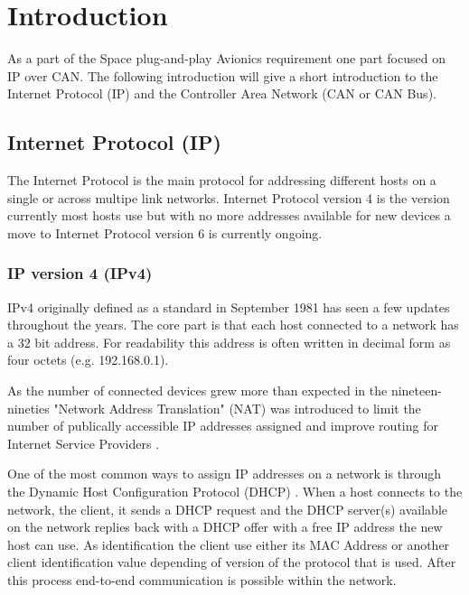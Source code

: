 \section{Introduction}\label{sec:introduction}
As a part of the Space plug-and-play Avionics requirement one part
focused on IP over CAN. The following introduction will give a short
introduction to the Internet Protocol (IP) and the Controller Area Network
(CAN or CAN Bus).

\subsection{Internet Protocol (IP)}
The Internet Protocol is the main protocol for addressing different hosts on a
single or across multipe link networks. Internet Protocol version 4 is the
version currently most hosts use but with no more addresses available
for new devices a move to Internet Protocol version 6 is currently ongoing.

\subsubsection{IP version 4 (IPv4)}\label{introduction:ipv4}
IPv4 originally defined as a standard in September 1981 \cite{web:rfc791} has
seen a few updates throughout the years. The core part is that each host
connected to a network has a 32 bit address. For readability this address
is often written in decimal form as four octets (e.g. 192.168.0.1).

As the number of connected devices grew more than expected in the nineteen-nineties
"Network Address Translation" (NAT) was introduced to limit the number of
publically accessible IP addresses assigned and improve routing for Internet
Service Providers \cite{web:rfc1631, web:rfc1918, web:rfc3022}.

One of the most common ways to assign IP addresses on a network is through the
Dynamic Host Configuration Protocol (DHCP) \cite{web:rfc2131, web:rfc2132, web:rfc4361}.
When a host connects to the network, the client, it sends a DHCP request and the DHCP
server(s) available on the network replies back with a DHCP offer with a free
IP address the new host can use. As identification the client use either its
MAC Address or another client identification value depending of version of the
protocol that is used. After this process end-to-end communication is possible
within the network.

